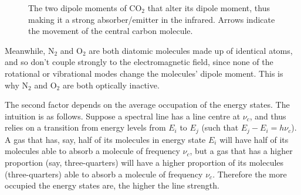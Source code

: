 \begin{figure}[H]
    \caption{The two dipole moments of CO$_2$ that alter its dipole moment, thus making it a strong absorber/emitter in the infrared. Arrows indicate the movement of the central carbon molecule.}
    \label{CO2 Dipole}
\end{figure}

Meanwhile, N$_2$ and O$_2$ are both diatomic molecules made up of identical atoms, and so don't couple strongly to the electromagnetic field, since none of the rotational or vibrational modes change the molecules' dipole moment. This is why N$_2$ and O$_2$ are both optically inactive.

The second factor depends on the average occupation of the energy states. The intuition is as follows. Suppose a spectral line has a line centre at $\nu_c$, and thus relies on a transition from energy levels from $E_i$ to $E_j$ (such that $E_j-E_i=h\nu_c$). A gas that has, say, half of its molecules in energy state $E_i$ will have half of its molecules able to absorb a molecule of frequency $\nu_c$, but a gas that has a higher proportion (say, three-quarters) will have a higher proportion of its molecules (three-quarters) able to absorb a molecule of frequency $\nu_c$. Therefore the more occupied the energy states are, the higher the line strength.

